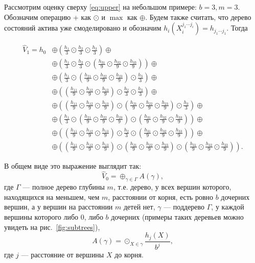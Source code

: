 \documentclass[specialist,
               substylefile = ../spbu.rtx,
               subf,href,colorlinks=true, 12pt]{disser}
\newcommand{\Vhat}{\hat{V}}
\begin{document}
Рассмотрим оценку сверху \eqref{eq:upper} на небольшом примере: $b = 3, m = 3$. Обозначим операцию + как $\odot$ и $\max$ как $\oplus$. Будем также считать, что дерево состояний актива уже смоделировано и обозначим $h_i\left(X_i^{j_1\cdots j_i}\right) = h_{j_1\cdots j_1}$. Тогда

$$
\begin{aligned}
\Vhat_1 = h_0 &\oplus \left(\frac{h_1}{3}\odot\frac{h_2}{3}\odot\frac{h_3}{3}\right)\oplus \\
    &\oplus \left(\frac{h_1}{3}\odot\frac{h_2}{3}\odot\left(\frac{h_{31}}{9}\odot\frac{h_{32}}{9}\odot\frac{h_{33}}{9}\right)\right) \oplus \\
    &\oplus \left(\frac{h_1}{3}\odot\left(\frac{h_{21}}{9}\odot\frac{h_{22}}{9}\odot\frac{h_{23}}{9}\right)\odot\frac{h_3}{3}\right) \oplus \\
    &\oplus \left(\left(\frac{h_{11}}{9}\odot\frac{h_{12}}{9}\odot\frac{h_{13}}{9}\right)\odot\frac{h_2}{3}\odot\frac{h_3}{3}\right)\oplus \\
    &\oplus\left(\left(\frac{h_{11}}{9}\odot\frac{h_{12}}{9}\odot\frac{h_{13}}{9}\right)\odot\left(\frac{h_{21}}{9}\odot\frac{h_{22}}{9}\odot\frac{h_{23}}{9}\right)\odot\frac{h_3}{3}\right)\oplus \\
    &\oplus \left(\frac{h_1}{3}\odot\left(\frac{h_{21}}{9}\odot\frac{h_{22}}{9}\odot\frac{h_{23}}{9}\right)\odot\left(\frac{h_{31}}{9}\odot\frac{h_{32}}{9}\odot\frac{h_{33}}{9}\right)\right) \oplus \\
    &\oplus \left(\left(\frac{h_{11}}{9}\odot\frac{h_{12}}{9}\odot\frac{h_{13}}{9}\right)\odot\frac{h_2}{3}\odot\left(\frac{h_{31}}{9}\odot\frac{h_{32}}{9}\odot\frac{h_{33}}{9}\right)\right)\oplus \\
    &\oplus \left(\left(\frac{h_{11}}{9}\odot\frac{h_{12}}{9}\odot\frac{h_{13}}{9}\right)\odot\left(\frac{h_{21}}{9}\odot\frac{h_{22}}{9}\odot\frac{h_{23}}{9}\right)\odot\left(\frac{h_{31}}{9}\odot\frac{h_{32}}{9}\odot\frac{h_{33}}{9}\right)\right).
\end{aligned}
$$


В общем виде это выражение выглядит так: $$\Vhat_0 = \oplus_{\gamma\in\Gamma}A\left(\gamma\right),$$ где $\Gamma$ --- полное дерево глубины $m$, т.е. дерево, у всех вершин которого, находящихся на меньшем, чем $m$, расстоянии от корня, есть ровно $b$ дочерних вершин, а у вершин на расстоянии $m$ детей нет, $\gamma$ --- поддерево $\Gamma$, у каждой вершины которого либо 0, либо $b$ дочерних (примеры таких деревьев можно увидеть на рис.~\ref{fig:subtrees}),
\[A\left(\gamma\right) = \odot_{X\in\gamma} \frac{h_j\left(X\right)}{b^j},\]
где $j$ --- расстояние от вершины $X$ до корня.
\end{document}
